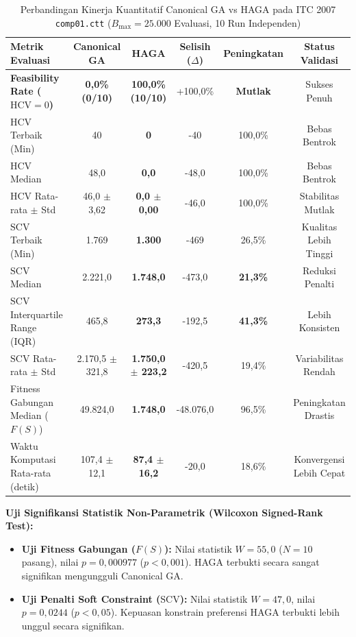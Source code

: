\documentclass[a4paper,11pt]{article}
\begin{document}
\begin{table}[htbp]
\centering
\small
\caption{Perbandingan Kinerja Kuantitatif Canonical GA vs HAGA pada ITC 2007 \texttt{comp01.ctt} ($B_{\max} = 25.000$ Evaluasi, 10 Run Independen)}
\label{tab:hasil_prapenelitian}
\vspace{0.15cm}
\begin{tabularx}{\textwidth}{lccccc}
\toprule
\textbf{Metrik Evaluasi} & \textbf{Canonical GA} & \textbf{HAGA} & \textbf{Selisih ($\Delta$)} & \textbf{Peningkatan} & \textbf{Status Validasi} \\
\midrule
\textbf{Feasibility Rate ($\text{HCV} = 0$)} & \textbf{0{,}0\% (0/10)} & \textbf{100{,}0\% (10/10)} & +100{,}0\% & \textbf{Mutlak} & Sukses Penuh \\
$\text{HCV}$ Terbaik (Min) & 40 & \textbf{0} & -40 & 100{,}0\% & Bebas Bentrok \\
$\text{HCV}$ Median & 48{,}0 & \textbf{0{,}0} & -48{,}0 & 100{,}0\% & Bebas Bentrok \\
$\text{HCV}$ Rata-rata $\pm$ Std & 46{,}0 $\pm$ 3{,}62 & \textbf{0{,}0 $\pm$ 0{,}00} & -46{,}0 & 100{,}0\% & Stabilitas Mutlak \\
\midrule
$\text{SCV}$ Terbaik (Min) & 1.769 & \textbf{1.300} & -469 & 26{,}5\% & Kualitas Lebih Tinggi \\
$\text{SCV}$ Median & 2.221{,}0 & \textbf{1.748{,}0} & -473{,}0 & \textbf{21{,}3\%} & Reduksi Penalti \\
$\text{SCV}$ Interquartile Range (IQR) & 465{,}8 & \textbf{273{,}3} & -192{,}5 & \textbf{41{,}3\%} & Lebih Konsisten \\
$\text{SCV}$ Rata-rata $\pm$ Std & 2.170{,}5 $\pm$ 321{,}8 & \textbf{1.750{,}0 $\pm$ 223{,}2} & -420{,}5 & 19{,}4\% & Variabilitas Rendah \\
\midrule
Fitness Gabungan Median ($F(S)$) & 49.824{,}0 & \textbf{1.748{,}0} & -48.076{,}0 & 96{,}5\% & Peningkatan Drastis \\
Waktu Komputasi Rata-rata (detik) & 107{,}4 $\pm$ 12{,}1 & \textbf{87{,}4 $\pm$ 16{,}2} & -20{,}0 & 18{,}6\% & Konvergensi Lebih Cepat \\
\bottomrule
\end{tabularx}
\end{table}

\noindent\textbf{Uji Signifikansi Statistik Non-Parametrik (Wilcoxon Signed-Rank Test):}
\begin{itemize}\setlength\itemsep{0em}
    \item \textbf{Uji Fitness Gabungan ($F(S)$):} Nilai statistik $W = 55{,}0$ ($N=10$ pasang), nilai $p = 0{,}000977$ ($p < 0{,}001$). HAGA terbukti secara sangat signifikan mengungguli Canonical GA.
    \item \textbf{Uji Penalti Soft Constraint ($\text{SCV}$):} Nilai statistik $W = 47{,}0$, nilai $p = 0{,}0244$ ($p < 0{,}05$). Kepuasan konstrain preferensi HAGA terbukti lebih unggul secara signifikan.
\end{itemize}
\end{document}

